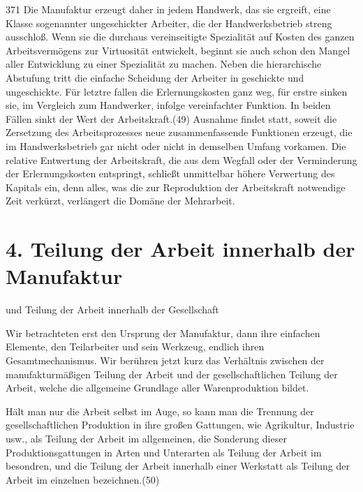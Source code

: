 {\num{371} Die Manufaktur erzeugt daher in jedem
Handwerk, das sie ergreift, eine Klasse sogenannter ungeschickter
Arbeiter, die der Handwerksbetrieb streng ausschloß. Wenn sie die
durchaus vereinseitigte Spezialität auf Kosten des ganzen
Arbeitsvermögens zur Virtuosität entwickelt, beginnt sie auch schon den
Mangel aller Entwicklung zu einer Spezialität zu machen. Neben die
hierarchische Abstufung tritt die einfache Scheidung der Arbeiter in
geschickte und ungeschickte. Für letztre fallen die Erlernungskosten
ganz weg, für erstre sinken sie, im Vergleich zum Handwerker, infolge
vereinfachter Funktion. In beiden Fällen sinkt der Wert der
Arbeitskraft.(49) Ausnahme findet statt, soweit die Zersetzung des
Arbeitsprozesses neue zusammenfassende Funktionen erzeugt, die im
Handwerksbetrieb gar nicht oder nicht in demselben Umfang vorkamen. Die
relative Entwertung der Arbeitskraft, die aus dem Wegfall oder der
Verminderung der Erlernungskosten entspringt, schließt unmittelbar
höhere Verwertung des Kapitals ein, denn alles, was die zur Reproduktion
der Arbeitskraft notwendige Zeit verkürzt, verlängert die Domäne der
Mehrarbeit.

{%
\section{4. Teilung der Arbeit innerhalb der
Manufaktur}\label{teilung-der-arbeit-innerhalb-der-manufaktur}}

und Teilung der Arbeit innerhalb der Gesellschaft

Wir betrachteten erst den Ursprung der Manufaktur, dann ihre einfachen
Elemente, den Teilarbeiter und sein Werkzeug, endlich ihren
Gesamtmechanismus. Wir berühren jetzt kurz das Verhältnis zwischen der
manufakturmäßigen Teilung der Arbeit und der gesellschaftlichen Teilung
der Arbeit, welche die allgemeine Grundlage aller Warenproduktion
bildet.

Hält man nur die Arbeit selbst im Auge, so kann man die Trennung der
gesellschaftlichen Produktion in ihre großen Gattungen, wie Agrikultur,
Industrie usw., als Teilung der Arbeit im allgemeinen, die Sonderung
dieser Produktionsgattungen in Arten und Unterarten als Teilung der
Arbeit im besondren, und die Teilung der Arbeit innerhalb einer
Werkstatt als Teilung der Arbeit im einzelnen bezeichnen.(50)

}
